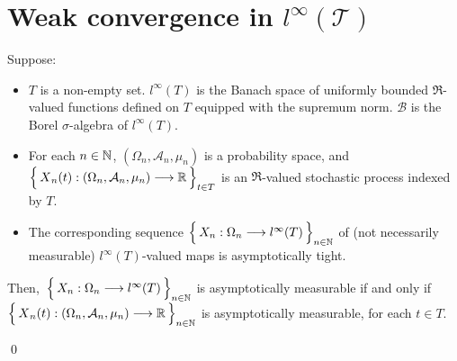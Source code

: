 

\section{Weak convergence in $l^{\infty}(\mathcal{T})$}
\setcounter{theorem}{0}
\setcounter{equation}{0}


\renewcommand{\theenumi}{\roman{enumi}}
\renewcommand{\labelenumi}{\textnormal{(\theenumi)}$\;\;$}


\begin{lemma}
\mbox{}\vskip 0.1cm
\noindent
Suppose:
\begin{itemize}
\item
	$T$ is a non-empty set.
	$l^{\infty}(T)$ is the Banach space of uniformly bounded $\Re$-valued functions defined on $T$
	equipped with the supremum norm.
	$\mathcal{B}$ is the Borel $\sigma$-algebra of $l^{\infty}(T)$.
\item
	For each $n\in\mathbb{N}$, $(\Omega_{n},\mathcal{A}_{n},\mu_{n})$ is a probability space, and
	\,$\left\{\,\overset{{\color{white}.}}{X}_{n}(t):(\Omega_{n},\mathcal{A}_{n},\mu_{n})\longrightarrow\Re\,\right\}_{t\in T}$
	is an $\Re$-valued stochastic process indexed by $T$.
\item
	The corresponding sequence
	$\left\{\,
		X_{n} : \Omega_{n}
		\overset{{\color{white}-}}{\longrightarrow}
		l^{\infty}(T)\,\right\}_{n\in\N}$
	of (not necessarily measurable) $l^{\infty}(T)$-valued maps
	is asymptotically tight.
\end{itemize}
Then,
\,$\left\{\,X_{n} : \Omega_{n}\overset{{\color{white}-}}{\longrightarrow}l^{\infty}(T)\,\right\}_{n\in\N}$
is asymptotically measurable if and only if
\,$\left\{\,\overset{{\color{white}.}}{X}_{n}(t) : (\Omega_{n},\mathcal{A}_{n},\mu_{n}) \longrightarrow \Re\,\right\}_{n\in\N}$
is asymptotically measurable, for each $t \in T$.
\end{lemma}
\proof
\qed


